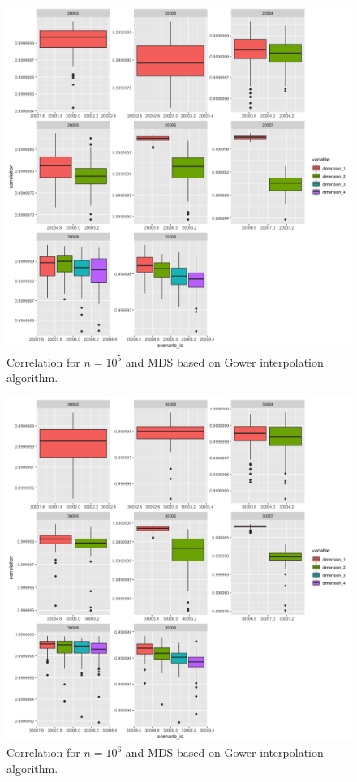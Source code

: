 \documentclass[11pt]{report}
\begin{document}
\begin{figure}[ht]
\centering
    \includegraphics[scale = 1.5]{./images/gower_correlation_100000.png}
    \caption{Correlation for $n = 10^5$ and MDS based on Gower interpolation algorithm.}
    \label{gower_correlation_100000}
\end{figure}

\begin{figure}[ht]
\centering
    \includegraphics[scale = 1.5]{./images/gower_correlation_1000000.png}
    \caption{Correlation for $n = 10^6$ and MDS based on Gower interpolation algorithm.}
    \label{gower_correlation_1000000}
\end{figure}
\end{document}
